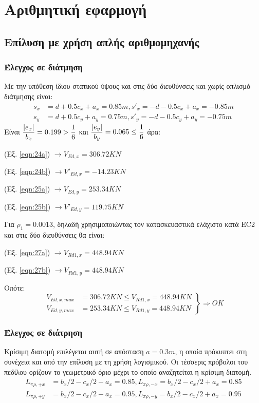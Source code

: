 \pagestyle{fancy}
\chapter{Αριθμητική εφαρμογή}
\section{Επίλυση με χρήση απλής αριθμομηχανής}
\subsection{Έλεγχος σε διάτμηση}
\noindent
Με την υπόθεση ίδιου στατικού ύψους και στις δύο διευθύνσεις και χωρίς οπλισμό διάτμησης είναι:
\begin{align*}
s_x &= d + 0.5 c_x + a_x = 0.85m, s'_x = -d - 0.5 c_x + a_x = -0.85m\\[5pt]
s_y &= d + 0.5 c_y + a_y = 0.75m, s'_y = -d - 0.5 c_y + a_y = -0.75m
\end{align*}
\noindent
Είναι $\dfrac{\lvert e_x\rvert}{b_x} = 0.199 > \dfrac{1}{6}$ και $\dfrac{\lvert e_y\rvert}{b_y} = 0.065 \leq \dfrac{1}{6}$ άρα:

\medskip

(Eξ. \ref{eqn:24a}) $\rightarrow V_{Ed,x} = 306.72 KN$

(Eξ. \ref{eqn:24b}) $\rightarrow V'_{Ed,x} = -14.23 KN$

(Eξ. \ref{eqn:25a}) $\rightarrow V_{Ed,y} = 253.34 KN$

(Eξ. \ref{eqn:25b}) $\rightarrow V'_{Ed,y} = 119.75 KN$

\noindent
Για $\rho_{1} = 0.0013$, δηλαδή χρησιμοποιώντας τον κατασκευαστικά ελάχιστο κατά \textlatin{EC2} και στις δύο διευθύνσεις θα είναι:

\medskip

(Eξ. \ref{eqn:27a}) $\rightarrow V_{Rd1,x} = 448.94 KN$

(Eξ. \ref{eqn:27b}) $\rightarrow V_{Rd1,y} = 448.94 KN$

\noindent
Οπότε:
\begin{equation*}
	\left.
	\begin{array}{ll}
		V_{Ed,x,max} & = 306.72 KN \leq V_{Rd1,x} = 448.94 KN\\
		V_{Ed,y,max} & = 253.34 KN \leq V_{Rd1,y} = 448.94 KN
	\end{array}
	\right \} \Rightarrow OK
\end{equation*}

\subsection{Έλεγχος σε διάτρηση}
Κρίσιμη διατομή επιλέγεται αυτή σε απόσταση $a = 0.3m$, η οποία πρόκυπτει στη συνέχεια και από την επίλυση με τη χρήση λογισμικού. Οι τέσσερις πρόβολοι του πεδίλου ορίζουν το γεωμετρικό όριο μέχρι το οποίο αναζητείται η κρίσιμη διατομή.
\begin{align*}
L_{\pi\rho,+x} & = b_x / 2 - c_x / 2 - a_x = 0.85, L_{\pi\rho,-x}  = b_x / 2 - c_x / 2 + a_x = 0.85\\[5pt]
L_{\pi\rho,+y} & = b_x / 2 - c_x / 2 - a_x = 0.95, L_{\pi\rho,-y} = b_x / 2 - c_x / 2 + a_x = 0.95
\end{align*}

